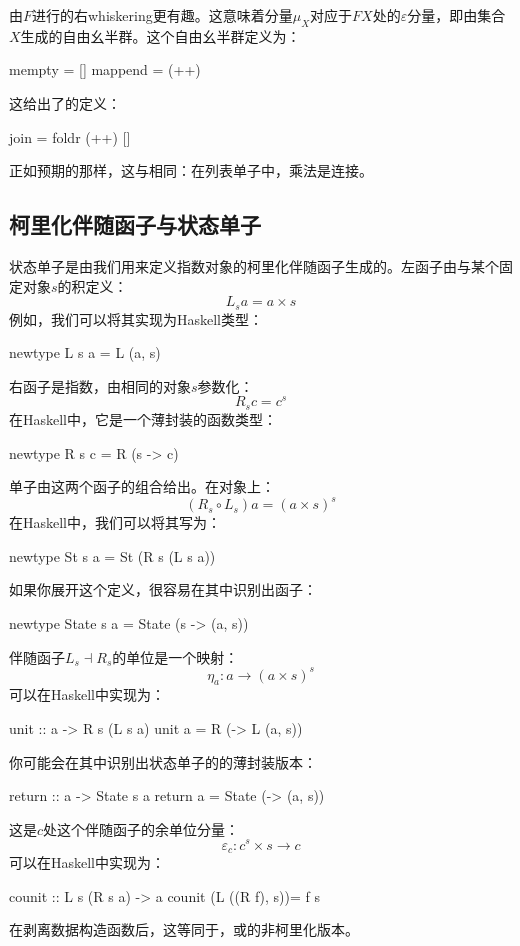\documentclass[DaoFP]{subfiles}
\begin{document}
由$F$进行的右whiskering更有趣。这意味着分量$\mu_X$对应于$F X$处的$\varepsilon$分量，即由集合$X$生成的自由幺半群。这个自由幺半群定义为：
\begin{haskell}
mempty = []
mappend = (++)
\end{haskell}
这给出了的定义：
\begin{haskell}
join = foldr (++) []
\end{haskell}
正如预期的那样，这与相同：在列表单子中，乘法是连接。

\subsection{柯里化伴随函子与状态单子}

状态单子是由我们用来定义指数对象的柯里化伴随函子生成的。左函子由与某个固定对象$s$的积定义：
\[ L_s a = a \times s \]
例如，我们可以将其实现为Haskell类型：
\begin{haskell}
newtype L s a = L (a, s)
\end{haskell}
右函子是指数，由相同的对象$s$参数化：
\[ R_s c = c^s \]
在Haskell中，它是一个薄封装的函数类型：
\begin{haskell}
newtype R s c = R (s -> c)
\end{haskell}

单子由这两个函子的组合给出。在对象上：
\[(R_s \circ L_s) a = (a \times s)^s \]
在Haskell中，我们可以将其写为：
\begin{haskell}
newtype St s a = St (R s (L s a))
\end{haskell}
如果你展开这个定义，很容易在其中识别出函子：
\begin{haskell}
newtype State s a = State (s -> (a, s))
\end{haskell}

伴随函子$L_s \dashv R_s$的单位是一个映射：
\[ \eta_a \colon a \to (a \times s)^s \]
可以在Haskell中实现为：
\begin{haskell}
unit :: a -> R s (L s a)
unit a = R (\s -> L (a, s))
\end{haskell}
你可能会在其中识别出状态单子的的薄封装版本：
\begin{haskell}
return :: a -> State s a
return a = State (\s -> (a, s))
\end{haskell}

这是$c$处这个伴随函子的余单位分量：
\[ \varepsilon_c \colon c^s \times s \to c \]
可以在Haskell中实现为：
\begin{haskell}
counit :: L s (R s a) -> a
counit (L ((R f), s))= f s
\end{haskell}
在剥离数据构造函数后，这等同于，或的非柯里化版本。
\end{document}
